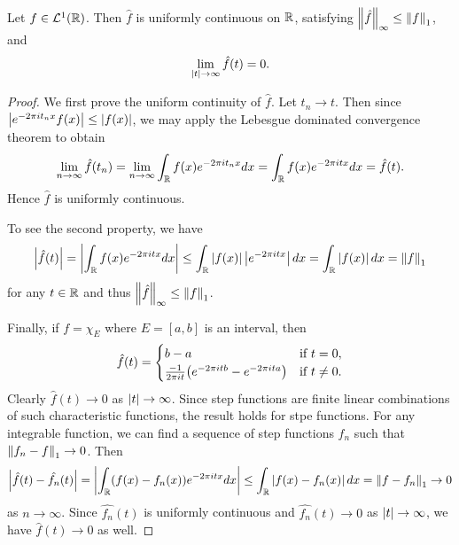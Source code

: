 \begin{lemma}
    Let $f\in\mathcal{L}^1(\mathbb{R})$. Then $\hat{f}$ is uniformly continuous on $\mathbb{R}$, 
    satisfying $\left\lVert {\hat{f}} \right\rVert_\infty\leq\left\lVert {f} \right\rVert_1$, and 
    \begin{equation*}
        \lim_{\left\lvert {t} \right\rvert\to\infty}\hat{f}(t) = 0.
    \end{equation*} 
\end{lemma}
\begin{proof}
    We first prove the uniform continuity of $\hat{f}$. Let 
    $t_n\to t$. Then since $\left\lvert {e^{-2\pi it_nx}f(x)} \right\rvert\leq \left\lvert {f(x)} \right\rvert$, 
    we may apply the Lebesgue dominated convergence theorem to obtain 
    \begin{equation*}
        \lim_{n\to\infty}\hat{f}(t_n) = \lim_{n\to\infty}\int_{\mathbb{R}}f(x)e^{-2\pi it_nx}dx 
        = \int_{\mathbb{R}}f(x)e^{-2\pi itx}dx = \hat{f}(t).
    \end{equation*}
    Hence $\hat{f}$ is uniformly continuous. 

    To see the second property, we have
    \begin{equation*}
        \left\lvert {\hat{f}(t)} \right\rvert = \left\lvert {\int_{\mathbb{R}}f(x)e^{-2\pi itx}dx} \right\rvert 
        \leq \int_{\mathbb{R}}\left\lvert {f(x)} \right\rvert\left\lvert {e^{-2\pi itx}} \right\rvert dx 
        = \int_{\mathbb{R}}\left\lvert {f(x)} \right\rvert dx = \left\lVert {f} \right\rVert_1
    \end{equation*}
    for any $t\in\mathbb{R}$ and thus $\left\lVert {\hat{f}} \right\rVert_\infty\leq\left\lVert {f} \right\rVert_1$. 

    Finally, if $f = \chi_E$ where $E = [a,b]$ is an interval, then 
    \begin{equation*}
        \hat{f}(t) = \begin{cases}
            b-a & \text{if }t=0, \\
            \frac{-1}{2\pi it}\pth{e^{-2\pi itb} - e^{-2\pi ita}} & \text{if }t\neq 0.
        \end{cases}
    \end{equation*}
    Clearly $\hat{f}(t)\to 0$ as $\left\lvert {t} \right\rvert\to\infty$. Since step functions 
    are finite linear combinations of such characteristic functions, 
    the result holds for stpe functions. For any integrable function, 
    we can find a sequence of step functions $f_n$ such that $\left\lVert {f_n-f} \right\rVert_1\to 0$. 
    Then 
    \begin{equation*}
        \left\lvert {\hat{f}(t) - \hat{f_n}(t)} \right\rvert = \left\lvert {\int_{\mathbb{R}}(f(x)-f_n(x))e^{-2\pi itx}dx} \right\rvert 
        \leq \int_{\mathbb{R}}\left\lvert {f(x)-f_n(x)} \right\rvert dx = \left\lVert {f-f_n} \right\rVert_1\to 0
    \end{equation*}
    as $n\to\infty$. Since $\hat{f_n}(t)$ is uniformly continuous and 
    $\hat{f_n}(t)\to 0$ as $\left\lvert {t} \right\rvert\to\infty$, we have $\hat{f}(t)\to 0$ 
    as well. 
\end{proof} 

